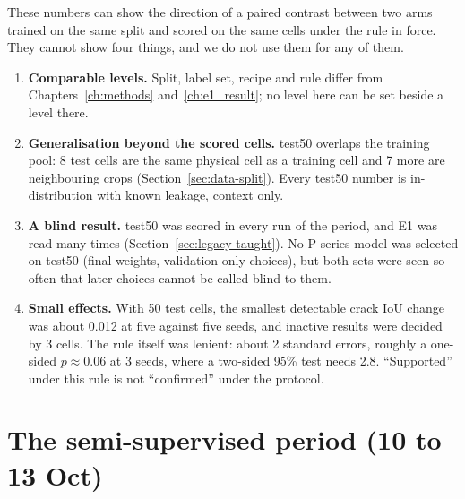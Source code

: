 These numbers can show the direction of a paired contrast between two arms trained on the same split and scored on the same cells
under the rule in force. They cannot show four things, and we do not use them for any of them.
\begin{enumerate}
  \item \textbf{Comparable levels.} Split, label set, recipe and rule differ from Chapters~\ref{ch:methods} and~\ref{ch:e1_result}; no
    level here can be set beside a level there.
  \item \textbf{Generalisation beyond the scored cells.} test50 overlaps the training pool: 8 test cells are the same physical cell as
    a training cell and 7 more are neighbouring crops (Section~\ref{sec:data-split}). Every test50 number is in-distribution with
    known leakage, context only.
  \item \textbf{A blind result.} test50 was scored in every run of the period, and E1 was read many times (Section~\ref{sec:legacy-taught}).
    No P-series model was selected on test50 (final weights, validation-only choices), but both sets were seen so often that later
    choices cannot be called blind to them.
  \item \textbf{Small effects.} With 50 test cells, the smallest detectable crack IoU change was about 0.012 at five against five
    seeds, and inactive results were decided by 3 cells. The rule itself was lenient: about 2 standard errors, roughly a one-sided
    $p \approx 0.06$ at 3 seeds, where a two-sided 95\% test needs 2.8. ``Supported'' under this rule is not ``confirmed'' under the
    protocol.
\end{enumerate}

\section{The semi-supervised period (10 to 13 Oct)}\label{sec:legacy-ssl}

